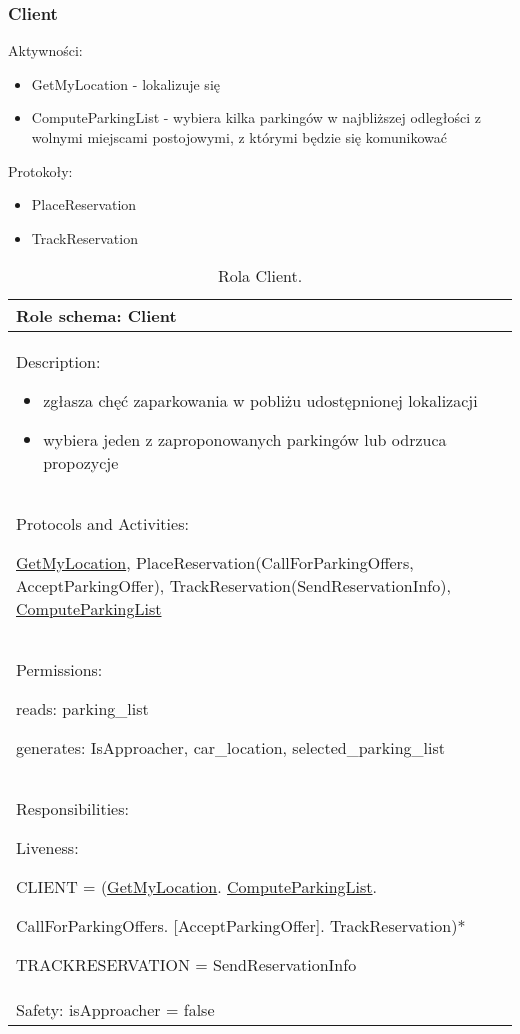 \newpage
\subsubsection{Client}

Aktywności:
\begin{itemize}
    \item GetMyLocation - lokalizuje się
    \item ComputeParkingList - wybiera kilka parkingów w najbliższej odległości z wolnymi miejscami postojowymi, z którymi będzie się komunikować

\end{itemize}

Protokoły:
\begin{itemize}
    \item PlaceReservation
    \item TrackReservation
\end{itemize}


\begin{table}[!h] \label{tab:rola1} \centering
    \caption{Rola Client.}
    \begin{tabular} {| p{14cm} |} \hline
        Role schema: Client \\ \hline
        Description:

        \begin{itemize}
            \item zgłasza chęć zaparkowania w pobliżu udostępnionej lokalizacji
            \item wybiera jeden z zaproponowanych parkingów lub odrzuca propozycje
            
        \end{itemize} \\ \hline
        Protocols and Activities: 
        
        \ul{GetMyLocation}, PlaceReservation(CallForParkingOffers, AcceptParkingOffer), TrackReservation({\color{teal}SendReservationInfo}), \ul{ComputeParkingList} \\ \hline
        Permissions:

        reads: parking\_list

        generates:  IsApproacher, car\_location, selected\_parking\_list \\ \hline
        Responsibilities:

        Liveness: 
        
        {\color{teal}CLIENT = (\ul{GetMyLocation}. \ul{ComputeParkingList}.}

        {\color{teal}CallForParkingOffers. [AcceptParkingOffer]. TrackReservation)*}

        {\color{teal}TRACKRESERVATION = SendReservationInfo}\\


        Safety: isApproacher = false \\ \hline
    \end{tabular}
\end{table}


